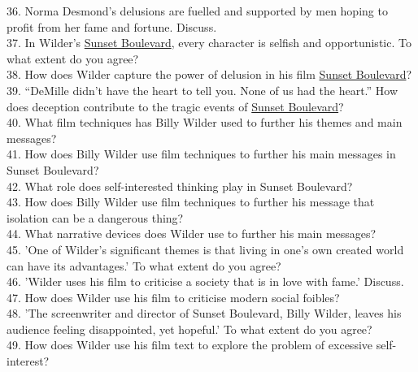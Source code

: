 \documentclass[a4paper]{article}
\begin{document}
36. Norma Desmond’s delusions are fuelled and supported by men hoping to profit from her fame and fortune. Discuss.\\

37. In Wilder’s \underline{Sunset Boulevard}, every character is selfish and opportunistic. To what extent do you agree?\\

38. How does Wilder capture the power of delusion in his film \underline{Sunset Boulevard}?\\

39. “DeMille didn’t have the heart to tell you. None of us had the heart.” How does deception contribute to the tragic events of \underline{Sunset Boulevard}?\\



40. What film techniques has Billy Wilder used to further his themes and main messages?\\

41. How does Billy Wilder use film techniques to further his main messages in Sunset Boulevard?\\

42. What role does self-interested thinking play in Sunset Boulevard?\\

43. How does Billy Wilder use film techniques to further his message that isolation can be a dangerous thing?\\

44. What narrative devices does Wilder use to further his main messages?\\

45. 'One of Wilder's significant themes is that living in one's own created world can have its advantages.' To what extent do you agree?\\

46. 'Wilder uses his film to criticise a society that is in love with fame.' Discuss.\\

47. How does Wilder use his film to criticise modern social foibles?\\

48. 'The screenwriter and director of Sunset Boulevard, Billy Wilder, leaves his audience feeling disappointed, yet hopeful.' To what extent do you agree?\\

49. How does Wilder use his film text to explore the problem of excessive self-interest?\\
\end{document}
